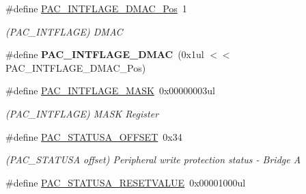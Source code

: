 \begin{DoxyCompactItemize}
\item 
\hypertarget{group___s_a_m_l21___p_a_c_ga62a7ac0a530370a04b2fa2686400b02e}{}\#define \hyperlink{group___s_a_m_l21___p_a_c_ga62a7ac0a530370a04b2fa2686400b02e}{P\+A\+C\+\_\+\+I\+N\+T\+F\+L\+A\+G\+E\+\_\+\+D\+M\+A\+C\+\_\+\+Pos}~1\label{group___s_a_m_l21___p_a_c_ga62a7ac0a530370a04b2fa2686400b02e}

\begin{DoxyCompactList}\small\item\em (P\+A\+C\+\_\+\+I\+N\+T\+F\+L\+A\+G\+E) D\+M\+A\+C \end{DoxyCompactList}\item 
\hypertarget{group___s_a_m_l21___p_a_c_ga8718ea5f59fc8b73d3c133083b112026}{}\#define {\bfseries P\+A\+C\+\_\+\+I\+N\+T\+F\+L\+A\+G\+E\+\_\+\+D\+M\+A\+C}~(0x1ul $<$$<$ P\+A\+C\+\_\+\+I\+N\+T\+F\+L\+A\+G\+E\+\_\+\+D\+M\+A\+C\+\_\+\+Pos)\label{group___s_a_m_l21___p_a_c_ga8718ea5f59fc8b73d3c133083b112026}

\item 
\hypertarget{group___s_a_m_l21___p_a_c_ga34b3f9c21c58711679aafd34a24e38da}{}\#define \hyperlink{group___s_a_m_l21___p_a_c_ga34b3f9c21c58711679aafd34a24e38da}{P\+A\+C\+\_\+\+I\+N\+T\+F\+L\+A\+G\+E\+\_\+\+M\+A\+S\+K}~0x00000003ul\label{group___s_a_m_l21___p_a_c_ga34b3f9c21c58711679aafd34a24e38da}

\begin{DoxyCompactList}\small\item\em (P\+A\+C\+\_\+\+I\+N\+T\+F\+L\+A\+G\+E) M\+A\+S\+K Register \end{DoxyCompactList}\item 
\hypertarget{group___s_a_m_l21___p_a_c_gabf62b1837716a321c16770a76d164572}{}\#define \hyperlink{group___s_a_m_l21___p_a_c_gabf62b1837716a321c16770a76d164572}{P\+A\+C\+\_\+\+S\+T\+A\+T\+U\+S\+A\+\_\+\+O\+F\+F\+S\+E\+T}~0x34\label{group___s_a_m_l21___p_a_c_gabf62b1837716a321c16770a76d164572}

\begin{DoxyCompactList}\small\item\em (P\+A\+C\+\_\+\+S\+T\+A\+T\+U\+S\+A offset) Peripheral write protection status -\/ Bridge A \end{DoxyCompactList}\item 
\hypertarget{group___s_a_m_l21___p_a_c_ga2183163da5a36f6ead159c41fc6b9ac4}{}\#define \hyperlink{group___s_a_m_l21___p_a_c_ga2183163da5a36f6ead159c41fc6b9ac4}{P\+A\+C\+\_\+\+S\+T\+A\+T\+U\+S\+A\+\_\+\+R\+E\+S\+E\+T\+V\+A\+L\+U\+E}~0x00001000ul\label{group___s_a_m_l21___p_a_c_ga2183163da5a36f6ead159c41fc6b9ac4}


\end{DoxyCompactItemize}
